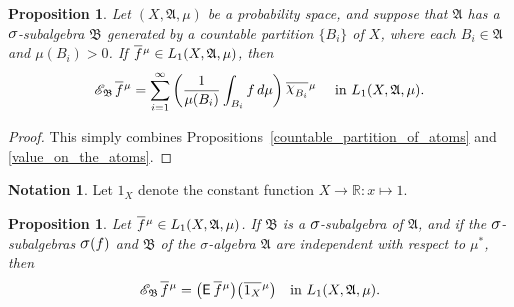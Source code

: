 \documentclass[
twoside=true,
paper=letter,
fontsize=11pt,
pagesize=auto,
leqno,
openany,
headsepline,
overfullrule,
]{scrbook}
\theoremstyle{plain}
\theoremstyle{plain}
\newtheorem{prop}[thm]{Proposition}
\theoremstyle{definition}
\newtheorem{notn}[thm]{Notation}
\theoremstyle{bfnoteitalic}
\theoremstyle{bfnoteroman}
\newcommand{\sigalg}[1]{\mathfrak{#1}}
\newcommand{\cali}[1]{\mathscr{#1}}
\newcommand{\sfop}[1]{\mathsf{#1}}
\newcommand{\expval}{\sfop{E}\,}
\newcommand{\condexpsub}[2]
{\mathop{\cali{E}\hspace{-1.5pt}}\nolimits_{#2}\hspace{-1pt}#1}
\newcommand{\sagb}{\mathop{\hbox{\large{$\sigma$}}}\nolimits}
\newcommand{\textsigma}{\hbox{\large{$\sigma$}}\kern-1pt}
\newcommand{\charfunction}[1]{{\raisebox{2pt}{$\chi$}}_{#1}}
\newcommand{\R}{\mathbb{R}}
\newcommand{\sigmaalgebra}{\sigalg{A}}
\newcommand{\sigmaalgebraii}{\sigalg{B}}
\newcommand{\oneonomega}{1_\measurespace}
\newcommand{\sigalgb}{\sigmaalgebraii}
\newcommand{\function}{f}
\newcommand{\measurespace}{X}
\newcommand{\mspaceelt}{x}
\newcommand{\measure}{\mu}
\newcommand*\xbar[1]{%
   \hbox{%
     \vbox{%
       \hrule height 0.4pt %
       \kern0.4ex%
       \hbox{%
         \ensuremath{#1}%
       }%
     }%
   }%
}
\newcommand{\lebclass}[1]{\hspace{.5pt}\xbar{#1}\hspace{0.5pt}}
\newcommand{\ellclass}[2]{\lebclass{#1}^{#2}}
\begin{document}
\begin{prop}\label{conditional_expectation_countable}
Let $(\measurespace, \sigmaalgebra,\measure)$ be a probability space, and suppose that $\sigmaalgebra$ has a 
$\textsigma$-subalgebra $\sigmaalgebraii$ generated by a countable partition $\{B_i\}$ of $\measurespace$, where each $B_i\in\sigmaalgebra$ and $\measure(B_i)>0$. 
If $\ellclass{\function}{\measure} \in L_1(\measurespace, \sigmaalgebra,\measure)$, then
\[
\condexpsub{\ellclass{\function}{\measure}}{\sigalgb}
=
\sum_{i=1}^{\infty}
\left(
\frac{1}{\measure(B_i)}
\int_{B_i} \function\, d\measure
\right)
\ellclass{\charfunction{B_i}}{\measure}
\quad \text{ in $L_1(\measurespace, \sigmaalgebra,\measure)$.}
\]
\end{prop}

\begin{proof}
This simply combines Propositions~\ref{countable_partition_of_atoms} and \ref{value_on_the_atoms}.
\end{proof}



\begin{notn}
Let $\oneonomega$ denote the constant function $\measurespace\to\R:\mspaceelt\mapsto 1$.
\end{notn}




\begin{prop}\label{conditional_is_expected}
Let $\ellclass{\function}{\measure}\in L_1(\measurespace, \sigmaalgebra,\measure)$.
If $\sigmaalgebraii$ is a $\textsigma$-subalgebra of $\sigmaalgebra$, and if the 
$\textsigma$-subalgebras $\sagb(\function)$ and 
$\sigmaalgebraii$ of the \textsigma-algebra $\sigmaalgebra$ are independent with respect to $\measure^*$, then
\[
\condexpsub{\ellclass{\function}{\measure}}{\sigmaalgebraii}
=  
\bigl(\expval{\ellclass{\function}{\measure}}\bigr)
\bigl(\ellclass{\oneonomega}{\measure}\bigr) 
\quad
\text{in $L_1(\measurespace, \sigmaalgebra,\measure)$.}
\]
\end{prop}
\end{document}
